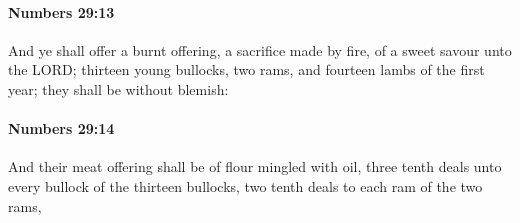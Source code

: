 		\paragraph{Numbers 29:13} %
			\label{NUMBERS-29-13}

			And ye shall offer a burnt offering, a sacrifice made by fire, of a sweet savour unto the LORD; thirteen young bullocks, two rams, and fourteen lambs of the first year; they shall be without blemish:


		\paragraph{Numbers 29:14} %
			\label{NUMBERS-29-14}

			And their meat offering shall be of flour mingled with oil, three tenth deals unto every bullock of the thirteen bullocks, two tenth deals to each ram of the two rams,

